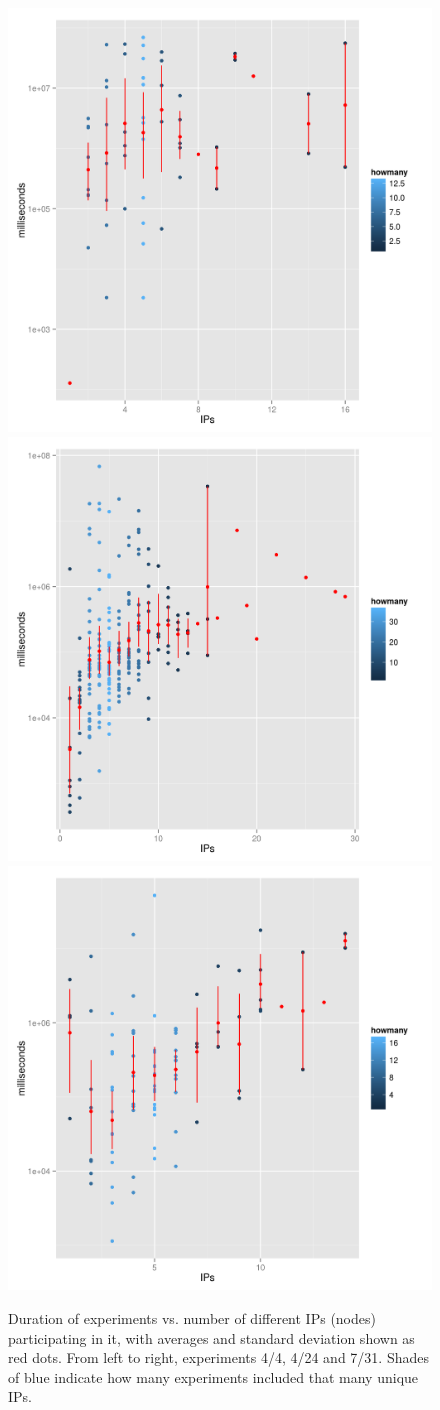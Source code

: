 \documentclass[journal,onecolumn]{IEEEtran}
\begin{document}
\begin{figure}[!htb]
\centering
\includegraphics[width=0.32\linewidth]{time-vs-ips-OS-4-4.png}
\includegraphics[width=0.32\linewidth]{time-vs-ips-OS-4-24.png}
\includegraphics[width=0.32\linewidth]{time-vs-ips-OS-7-31.png}
\caption{Duration of experiments vs. number of different IPs (nodes)
  participating in it, with averages and standard deviation shown as
  red dots. From left to right, experiments 4/4, 4/24 and 7/31. Shades
of blue indicate how many experiments included that many unique IPs.}
\label{fig:duration}
\end{figure}
%
\end{document}
